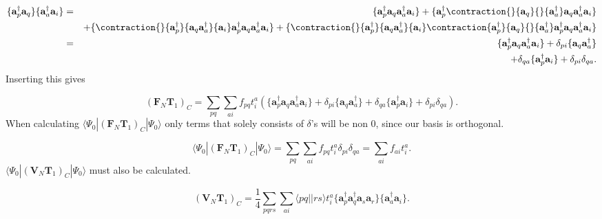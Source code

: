 \begin{align}
\{ \textbf{a}^{\dag}_p \textbf{a}_q\}  \{\textbf{a}^{\dag}_a \textbf{a}_i \} & = &
\{ \textbf{a}^{\dag}_p \textbf{a}_q \textbf{a}^{\dag}_a \textbf{a}_i \} + \{ \textbf{a}^{\dag}_p
\contraction{}{\textbf{a}_q}{}{\textbf{a}^{\dag}_a}
\textbf{a}_q \textbf{a}^{\dag}_a
\textbf{a}_i \}  \\ & &
+  \{
\contraction{}{\textbf{a}^{\dag}_p}{ \textbf{a}_q \textbf{a}^{\dag}_a}{\textbf{a}_i}
\textbf{a}^{\dag}_p \textbf{a}_q \textbf{a}^{\dag}_a \textbf{a}_i \} 
+ \{
\contraction{}{\textbf{a}^{\dag}_p}{\textbf{a}_q \textbf{a}^{\dag}_a}{\textbf{a}_i}
\contraction{\textbf{a}^{\dag}_p}{\textbf{a}_q}{} {\textbf{a}^{\dag}_a}
\textbf{a}^{\dag}_p \textbf{a}_q \textbf{a}^{\dag}_a \textbf{a}_i \} \nonumber \\ & = &
\{ \textbf{a}^{\dag}_p \textbf{a}_q \textbf{a}^{\dag}_a \textbf{a}_i \} + \delta_{pi} \{\textbf{a}_q \textbf{a}_a^{\dag} \} \nonumber \\ & &
+ \delta_{qa} \{\textbf{a}_p^{\dag} \textbf{a}_i \} 
+ \delta_{pi} \delta_{qa} . \nonumber
\end{align}
Inserting this gives 

\begin{equation}
(\textbf{F}_N \textbf{T}_1)_C = \sum_{pq} \sum_{ai} f_{pq} t_i^a \left(\{ \textbf{a}^{\dag}_p \textbf{a}_q \textbf{a}^{\dag}_a \textbf{a}_i \} + \delta_{pi} \{\textbf{a}_q \textbf{a}_a^{\dag} \} 
+ \delta_{qa} \{\textbf{a}_p^{\dag} \textbf{a}_i \} 
+ \delta_{pi} \delta_{qa} \right) .
\end{equation}
When calculating $\langle \Psi_0 | (\textbf{F}_N \textbf{T}_1)_C | \Psi_0 \rangle$ only terms that solely consists of $\delta$'s will be non 0, since our basis is orthogonal. 

\begin{equation}
\langle \Psi_0 | (\textbf{F}_N \textbf{T}_1)_C | \Psi_0 \rangle =  \sum_{pq} \sum_{ai} f_{pq} t_i^a\delta_{pi} \delta_{qa} = \sum_{ai} f_{ai} t_i^a . \label{f_t1}
\end{equation}
$\langle \Psi_0 | (\textbf{V}_N \textbf{T}_1)_C | \Psi_0 \rangle$ must also be calculated.

\begin{equation}
(\textbf{V}_N \textbf{T}_1 )_C = \frac{1}{4} \sum_{pqrs} \sum_{ai} \langle pq||rs \rangle t_i^a \{\textbf{a}^{\dag}_p \textbf{a}^{\dag}_q \textbf{a}_s \textbf{a}_r \} \{\textbf{a}_a^{\dag} \textbf{a}_i \} .
\end{equation}

